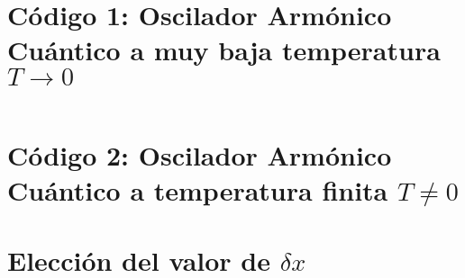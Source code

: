 \documentclass[%
 reprint,
 amsmath,amssymb,
 aps,
 pra,
]{revtex4-2}
\begin{document}
\begin{widetext}

\section{Código 1: Oscilador Armónico Cuántico a muy baja temperatura \texorpdfstring{$T \rightarrow 0$}{T tendiendo a cero}\label{appx:codigo_baja_temperatura}}

\inputminted[linenos,breaklines]{python}{code_1.py}

\section{Código 2: Oscilador Armónico Cuántico a temperatura finita \texorpdfstring{$T \neq 0$}{T diferente de cero}\label{appx:codigo_temperatura_finita}}

\section{Elección del valor de \texorpdfstring{$\delta x$}{dx}\label{appx:valor-dx}}

\end{widetext}




\nocite{*}

\end{document}
